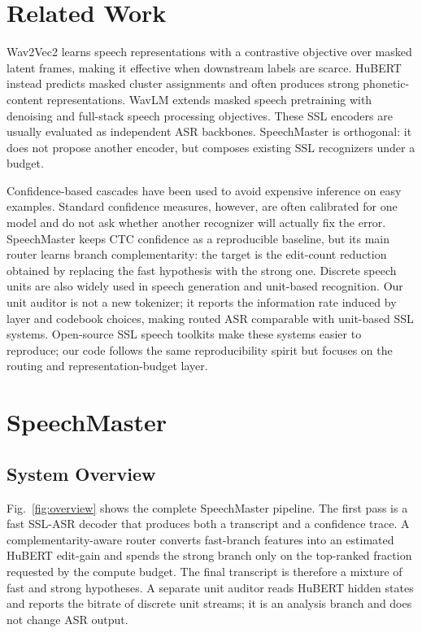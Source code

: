 \documentclass{article}
\begin{document}
\section{Related Work}

Wav2Vec2 learns speech representations with a contrastive objective over masked
latent frames, making it effective when downstream labels are scarce. HuBERT
instead predicts masked cluster assignments and often produces strong
phonetic-content representations. WavLM extends masked speech pretraining with
denoising and full-stack speech processing objectives. These SSL encoders are
usually evaluated as independent ASR backbones. SpeechMaster is orthogonal: it
does not propose another encoder, but composes existing SSL recognizers under a
budget.

Confidence-based cascades have been used to avoid expensive inference on easy
examples. Standard confidence measures, however, are often calibrated for one
model and do not ask whether another recognizer will actually fix the error.
SpeechMaster keeps CTC confidence as a reproducible baseline, but its main
router learns branch complementarity: the target is the edit-count reduction
obtained by replacing the fast hypothesis with the strong one. Discrete speech
units are also widely used in speech generation and unit-based recognition. Our
unit auditor is not a new tokenizer; it reports the information rate induced by
layer and codebook choices, making routed ASR comparable with unit-based SSL
systems.
Open-source SSL speech toolkits make these systems easier to reproduce; our
code follows the same reproducibility spirit but focuses on the routing and
representation-budget layer.

\section{SpeechMaster}

\subsection{System Overview}

Fig.~\ref{fig:overview} shows the complete SpeechMaster pipeline. The first
pass is a fast SSL-ASR decoder that produces both a transcript and a confidence
trace. A complementarity-aware router converts fast-branch features into an
estimated HuBERT edit-gain and spends the strong branch only on the top-ranked
fraction requested by the compute budget. The final transcript is therefore a
mixture of fast and strong hypotheses. A separate unit auditor reads HuBERT
hidden states and reports the bitrate of discrete unit streams; it is an
analysis branch and does not change ASR output.
\end{document}
